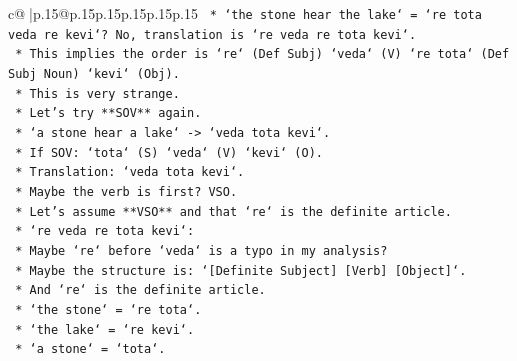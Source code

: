 \documentclass{article}
\begin{document}
{\begin{supertabular}{c@{$\;$}|p{.15\linewidth}@{}p{.15\linewidth}p{.15\linewidth}p{.15\linewidth}p{.15\linewidth}p{.15\linewidth}}
{{{\texttt{                                                                *   `the stone hear the lake` = `re tota veda re kevi`? No, translation is `re veda re tota kevi`.} \\
\texttt{                                                                *   This implies the order is `re` (Def Subj) `veda` (V) `re tota` (Def Subj Noun) `kevi` (Obj).} \\
\texttt{                                                                *   This is very strange.} \\
\texttt{                                                                *   Let's try **SOV** again.} \\
\texttt{                                                                    *   `a stone hear a lake` {-}> `veda tota kevi`.} \\
\texttt{                                                                    *   If SOV: `tota` (S) `veda` (V) `kevi` (O).} \\
\texttt{                                                                    *   Translation: `veda tota kevi`.} \\
\texttt{                                                                    *   Maybe the verb is first? VSO.} \\
\texttt{                                                                    *   Let's assume **VSO** and that `re` is the definite article.} \\
\texttt{                                                                    *   `re veda re tota kevi`:} \\
\texttt{                                                                        *   Maybe `re` before `veda` is a typo in my analysis?} \\
\texttt{                                                                        *   Maybe the structure is: `{[}Definite Subject{]} {[}Verb{]} {[}Object{]}`.} \\
\texttt{                                                                        *   And `re` is the definite article.} \\
\texttt{                                                                        *   `the stone` = `re tota`.} \\
\texttt{                                                                        *   `the lake` = `re kevi`.} \\
\texttt{                                                                        *   `a stone` = `tota`.} \\
}}}
\end{supertabular}}
\end{document}
